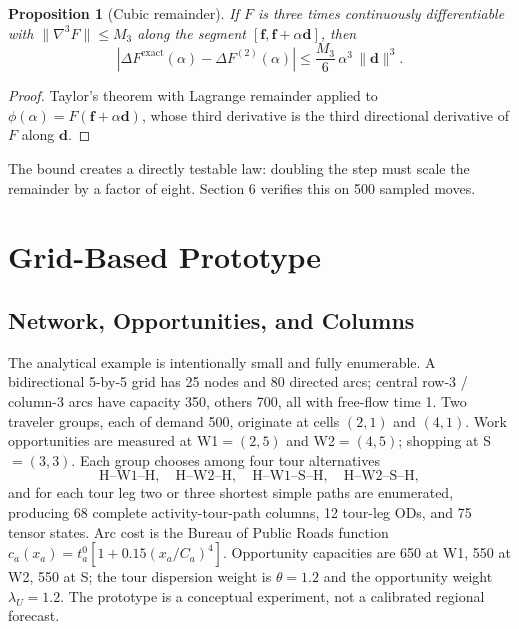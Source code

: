 \documentclass[10pt]{article}
\newtheorem{proposition}{Proposition}
\newcommand{\vect}[1]{\boldsymbol{#1}}
\begin{document}
\begin{proposition}[Cubic remainder]
If $F$ is three times continuously differentiable with $\|\nabla^3F\|\leq M_3$ along the segment $[\vect f,\vect f+\alpha\vect d]$, then
\begin{equation}
\left|\Delta F^{\mathrm{exact}}(\alpha)-\Delta F^{(2)}(\alpha)\right|
\leq \frac{M_3}{6}\,\alpha^{3}\,\|\vect d\|^{3}.
\label{eq:third_order}
\end{equation}
\end{proposition}

\begin{proof}
Taylor's theorem with Lagrange remainder applied to $\phi(\alpha)=F(\vect f+\alpha\vect d)$, whose third derivative is the third directional derivative of $F$ along $\vect d$.
\end{proof}

The bound creates a directly testable law: doubling the step must scale the remainder by a factor of eight. Section 6 verifies this on 500 sampled moves.

\section{Grid-Based Prototype}

\subsection{Network, Opportunities, and Columns}
The analytical example is intentionally small and fully enumerable. A bidirectional 5-by-5 grid has 25 nodes and 80 directed arcs; central row-3 / column-3 arcs have capacity 350, others 700, all with free-flow time 1. Two traveler groups, each of demand 500, originate at cells $(2,1)$ and $(4,1)$. Work opportunities are measured at W1$=(2,5)$ and W2$=(4,5)$; shopping at S$=(3,3)$. Each group chooses among four tour alternatives
\[
\text{H--W1--H},\quad \text{H--W2--H},\quad
\text{H--W1--S--H},\quad \text{H--W2--S--H},
\]
and for each tour leg two or three shortest simple paths are enumerated, producing 68 complete activity-tour-path columns, 12 tour-leg ODs, and 75 tensor states. Arc cost is the Bureau of Public Roads function $c_a(x_a)=t_a^0[1+0.15(x_a/C_a)^4]$. Opportunity capacities are 650 at W1, 550 at W2, 550 at S; the tour dispersion weight is $\theta=1.2$ and the opportunity weight $\lambda_U=1.2$. The prototype is a conceptual experiment, not a calibrated regional forecast.
\end{document}
